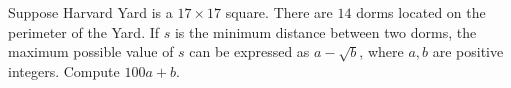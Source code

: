 Suppose Harvard Yard is a $17 \times 17$ square. There are $14$ dorms located on the perimeter of the Yard. If $s$ is the minimum distance between two dorms, the maximum possible value of $s$ can be expressed as $a - \sqrt{b}$, where $a, b$ are positive integers. Compute $100a + b$.
